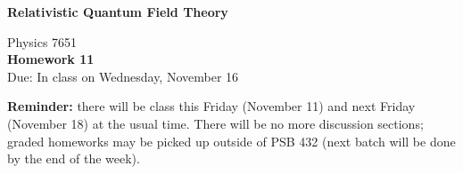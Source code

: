 \documentclass[12pt]{article}
\begin{document}
\vspace*{-1cm}
\begin{center}
{\LARGE \bf Relativistic Quantum Field Theory}

\vspace*{0.5cm}
{\Large Physics 7651} \\
\vspace*{0.5cm}
{\Large {\bf Homework 11}\\
\vspace*{0.5cm}
Due: In class on Wednesday, November 16}
\end{center}


\noindent\textbf{Reminder:} there will be class this Friday (November 11) and next Friday (November 18) at the usual time. There will be no more discussion sections; graded homeworks may be picked up outside of PSB 432 (next batch will be done by the end of the week). 
\end{document}
